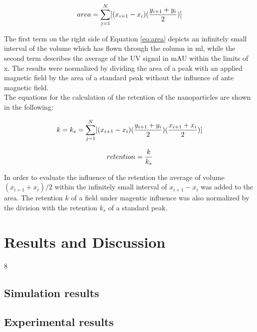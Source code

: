 \begin{equation}
\label{eq:area}
\centering
area = \sum_{j=1}^{N}[(x_{i+1}-x_{i})(\frac{y_{i+1}+y_{i}}{2})]
\end{equation}

The first term on the right side of Equation \ref{eq:area} depicts an infinitely small interval of the volume which has flown through the column in ml, while the second term describes the average of the UV signal in mAU within the limits of x. The results were normalized by dividing the area of a peak with an applied magnetic field by the area of a standard peak without the influence of ante magnetic field. \\


The equations for the calculation of the retention of the nanoparticles are shown in the following: 

\begin{equation}
\label{eq:ret_sum}
\centering
k = k_{s} = \sum_{j=1}^{N}[(x_{i+1}-x_{i})(\frac{y_{i+1}+y_{i}}{2})(\frac{x_{i+1}+x_{i}}{2})]
\end{equation}

\begin{equation}
\label{eq:ret_comp}
\centering
retention = \frac{k}{k_{s}}
\end{equation}

In order to evaluate the influence of the retention the average of volume $(x_{i+1}+x_{i})/2$ within the infinitely small interval of $x_{i+1}-x_{i}$ was added to the area. The retention $k$ of a field under magentic influence was also normalized by the division with the retention $k_{s}$ of a standard peak.   



\chapter{Results and Discussion}8
\label{chap:chap_res}

\section{Simulation results}
\section{Experimental results}

